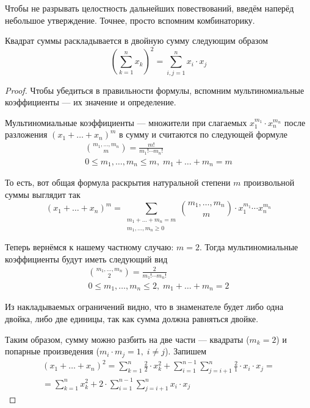 Чтобы не разрывать целостность дальнейших повествований, введём наперёд
небольшое утверждение. Точнее, просто вспомним комбинаторику.
\begin{affirmation}\label{affirmation:squaredSum}
    Квадрат суммы раскладывается в двойную сумму следующим образом
    $$\left( \sum_{k=1}^n x_k \right)^2 = \sum_{i, j = 1}^{n} x_i \cdot x_j$$
\end{affirmation}
\begin{proof}
    Чтобы убедиться в правильности формулы, вспомним мультиномиальные
    коэффициенты --- их значение и определение.

    Мультиномиальные коэффициенты --- множители при слагаемых
    $x_1^{m_1} \cdot x_n^{m_n}$ после разложения
    $\left( x_1 + \dots + x_n \right)^m$ в сумму и считаются по следующей
    формуле \cite[с.~28]{Grimaldi}
    \begin{align*}
        {m_1, \dots, m_n \choose m} = \frac{m!}{m_1! \cdots m_n!} \\
            0 \le m_1, \dots, m_n \le m,\; m_1 + \dots + m_n = m
    \end{align*}

    То есть, вот общая формула раскрытия натуральной степени $m$ произвольной
    суммы выглядит так
    $$\left( x_1 + \dots + x_n \right)^m
        = \sum_{
                \substack{m_1 + \dots + m_n = m \\
                m_1, \dots, m_n \ge 0}}
            {m_1, \dots, m_n \choose m} \cdot x_1^{m_1} \cdots x_n^{m_n}$$

    Теперь вернёмся к нашему частному случаю: $m=2$. Тогда мультиномиальные
    коэффициенты будут иметь следующий вид
    \begin{align*}
    {m_1, \dots, m_n \choose 2} = \frac{2}{m_1! \cdots m_n!} \\
        0 \le m_1, \dots, m_n \le 2,\; m_1 + \dots + m_n = 2
    \end{align*}

    Из накладываемых ограничений видно, что в знаменателе будет либо одна
    двойка, либо две единицы, так как сумма должна равняться двойке.

    Таким образом, сумму можно разбить на две части --- квадраты ($m_k = 2$)
    и попарные произведения ($m_i \cdot m_j = 1,\; i \neq j$). Запишем
    \begin{equation}\label{eq:squaredSumStart}
        \begin{split}
            \left( x_1 + \dots + x_n \right)^2
                = \sum_{k=1}^{n} \frac{2}{2} \cdot x_k^2
                    + \sum_{i=1}^{n-1}
                        \sum_{j=i+1}^n \frac{2}{1} \cdot x_i \cdot x_j = \\
                = \sum_{k=1}^{n} x_k^2
                    + 2 \cdot \sum_{i=1}^{n-1} \sum_{j=i+1}^n x_i \cdot x_j
        \end{split}
    \end{equation}


\end{proof}
